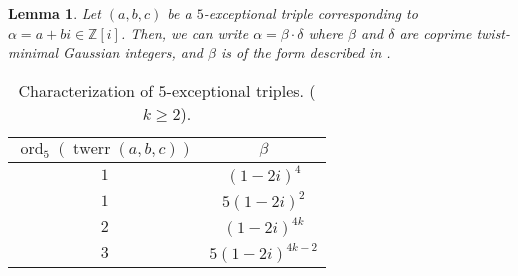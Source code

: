 \documentclass[12pt]{amsart}
\newcounter{counter}[section] %
\numberwithin{equation}{section} %
\newtheorem{lemma}[counter]{Lemma}
\theoremstyle{definition} \newtheorem{definition}[counter]{Definition}
\theoremstyle{remark} \newtheorem{nonexam}[counter]{Non-example}
\newcommand{\ZZ}{\mathbb{Z}} %
\DeclareMathOperator{\ord}{ord} %
\DeclareMathOperator{\twerr}{twerr} %
\begin{document}
\begin{lemma} \label{lemma:characterization-5-exceptional-triples}
  Let $(a,b,c)$ be a $5$-exceptional triple corresponding to
  $\alpha = a+bi \in \ZZ[i]$. Then, we can write $\alpha = \beta\cdot\delta$
  where $\beta$ and $\delta$ are coprime twist-minimal Gaussian integers, and
  $\beta$ is of the form described in
  .
\end{lemma}
\begin{table}[ht]
    \begin{tabular}{|c|c|}
      \hline
      $\ord_5(\twerr(a,b,c))$ & $\beta$               \\ \hline
      $1$   & $(1 - 2i)^4$                            \\ \hline
      $1$   & $5(1 - 2i)^2$                           \\ \hline
      $2$   & $(1 - 2i)^{4k}$                         \\ \hline
      $3$   & $5(1 - 2i)^{4k-2}$                      \\ \hline
    \end{tabular}
    \caption{Characterization of $5$-exceptional triples. ($k \geq 2$). }
    \label{table:characterization-5-exceptional-triples}
\end{table}
\end{document}
